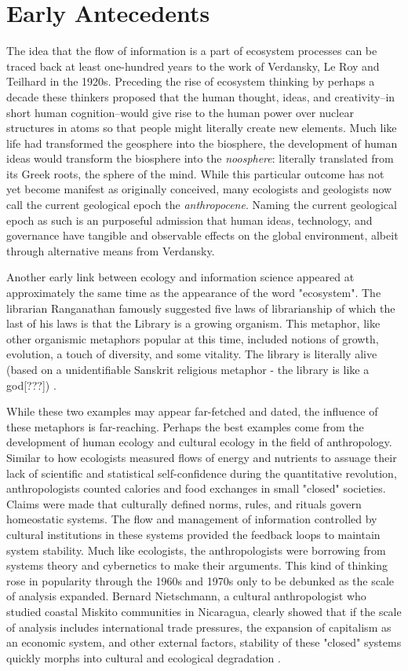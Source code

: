 \section{Early Antecedents}

The idea that the flow of information is a part of ecosystem processes can be traced back at least one-hundred years to the work of Verdansky, Le Roy and Teilhard in the 1920s. Preceding the rise of ecosystem thinking by perhaps a decade these thinkers proposed that the human thought, ideas, and creativity--in short human cognition--would give rise to the human power over nuclear structures in atoms so that people might literally create new elements. Much like life had transformed the geosphere into the biosphere, the development of human ideas would transform the biosphere into the \textit{noosphere}: literally translated from its Greek roots, the sphere of the mind. While this particular outcome has not yet become manifest as originally conceived, many ecologists and geologists now call the current geological epoch the \textit{anthropocene}. Naming the current geological epoch as such is an purposeful admission that human ideas, technology, and governance have tangible and observable effects on the global environment, albeit through alternative means from Verdansky. 

Another early link between ecology and information science appeared at approximately the same time as the appearance of the word "ecosystem". The librarian Ranganathan famously suggested five laws of librarianship of which the last of his laws is that the Library is a growing organism. This metaphor, like other organismic metaphors popular at this time, included notions of growth, evolution, a touch of diversity, and some vitality. The library is literally alive (based on a unidentifiable Sanskrit religious metaphor - the library is like a god[???]) \citep{ranganathan_1931}.

While these two examples may appear far-fetched and dated, the influence of these metaphors is far-reaching. Perhaps the best examples come from the development of human ecology and cultural ecology in the field of anthropology. Similar to how ecologists measured flows of energy and nutrients to assuage their lack of scientific and statistical self-confidence during the quantitative revolution, anthropologists counted calories and food exchanges in small "closed" societies. Claims were made that culturally defined norms, rules, and rituals govern homeostatic systems. The flow and management of information controlled by cultural institutions in these systems provided the feedback loops to maintain system stability. Much like ecologists, the anthropologists were borrowing from systems theory and cybernetics to make their arguments. This kind of thinking rose in popularity through the 1960s and 1970s only to be debunked as the scale of analysis expanded. Bernard Nietschmann, a cultural anthropologist who studied coastal Miskito communities in Nicaragua, clearly showed that if the scale of analysis includes international trade pressures, the expansion of capitalism as an economic system, and other external factors, stability of these "closed" systems quickly morphs into cultural and ecological degradation \citep{nietschmannn_1973}.

